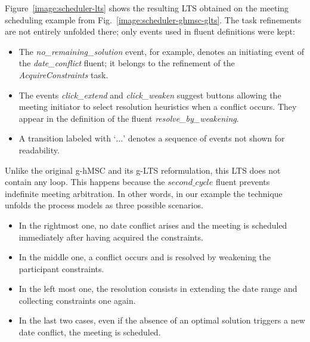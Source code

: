 Figure~\ref{image:scheduler-lts} shows the resulting LTS obtained on the meeting scheduling example from Fig.~\ref{image:scheduler-ghmsc-glts}. The task refinements are not entirely unfolded there; only events used in fluent definitions were kept:
\begin{itemize}
\item The \emph{no\_remaining\_solution} event, for example, denotes an initiating event of the \emph{date\_conflict} fluent; it belongs to the refinement of the \emph{AcquireConstraints} task. 
\item The events \emph{click\_extend} and \emph{click\_weaken} suggest buttons allowing the meeting initiator to select resolution heuristics when a conflict occurs. They appear in the definition of the fluent \emph{resolve\_by\_weakening}. 
\item A transition labeled with `$\ldots$' denotes a sequence of events not shown for readability.
\end{itemize}

Unlike the original g-hMSC and its g-LTS reformulation, this LTS does not contain any loop. This happens because the $second\_cycle$ fluent prevents indefinite meeting arbitration. In other words, in our example the technique unfolds the process models as three possible scenarios. 
\begin{itemize}
\item In the rightmost one, no date conflict arises and the meeting is scheduled immediately after having acquired the constraints. 
\item In the middle one, a conflict occurs and is resolved by weakening the participant constraints. 
\item In the left most one, the resolution consists in extending the date range and collecting constraints one again. \item In the last two cases, even if the absence of an optimal solution triggers a new date conflict, the meeting is scheduled. 
\end{itemize}

